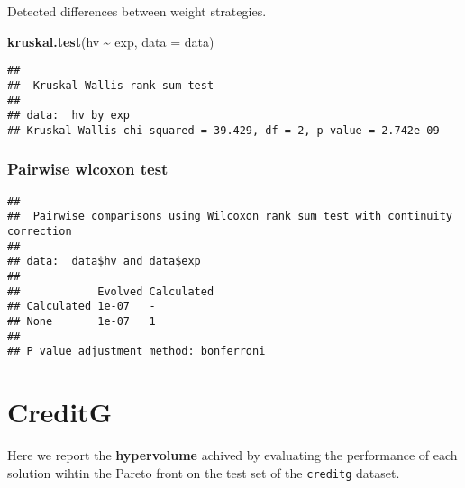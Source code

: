 \documentclass[
]{book}
\newenvironment{Shaded}{\begin{snugshade}}{\end{snugshade}}
\newcommand{\AttributeTok}[1]{\textcolor[rgb]{0.13,0.29,0.53}{#1}}
\newcommand{\ConstantTok}[1]{\textcolor[rgb]{0.56,0.35,0.01}{#1}}
\newcommand{\FunctionTok}[1]{\textcolor[rgb]{0.13,0.29,0.53}{\textbf{#1}}}
\newcommand{\NormalTok}[1]{#1}
\newcommand{\SpecialCharTok}[1]{\textcolor[rgb]{0.81,0.36,0.00}{\textbf{#1}}}
\newcommand{\StringTok}[1]{\textcolor[rgb]{0.31,0.60,0.02}{#1}}
\begin{document}
Detected differences between weight strategies.

\begin{Shaded}
\begin{Highlighting}[]
\FunctionTok{kruskal.test}\NormalTok{(hv }\SpecialCharTok{\textasciitilde{}}\NormalTok{ exp, }\AttributeTok{data =}\NormalTok{ data)}
\end{Highlighting}
\end{Shaded}

\begin{verbatim}
## 
##  Kruskal-Wallis rank sum test
## 
## data:  hv by exp
## Kruskal-Wallis chi-squared = 39.429, df = 2, p-value = 2.742e-09
\end{verbatim}

\hypertarget{pairwise-wlcoxon-test-2}{%
\subsection{Pairwise wlcoxon test}\label{pairwise-wlcoxon-test-2}}

\begin{Shaded}
\end{Shaded}

\begin{verbatim}
## 
##  Pairwise comparisons using Wilcoxon rank sum test with continuity correction 
## 
## data:  data$hv and data$exp 
## 
##            Evolved Calculated
## Calculated 1e-07   -         
## None       1e-07   1         
## 
## P value adjustment method: bonferroni
\end{verbatim}

\hypertarget{creditg}{%
\chapter{CreditG}\label{creditg}}

Here we report the \textbf{hypervolume} achived by evaluating the performance of each solution wihtin the Pareto front on the test set of the \texttt{creditg} dataset.
\end{document}
